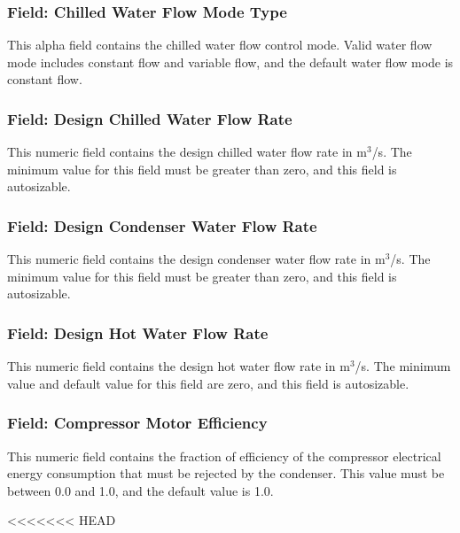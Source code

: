 \subsubsection{Field: Chilled Water Flow Mode Type}\label{field-chilled-water-flow-mode-type}

This alpha field contains the chilled water flow control mode. Valid water flow mode includes constant flow and variable flow, and the default water flow mode is constant flow.

\subsubsection{Field: Design Chilled Water Flow Rate}\label{field-design-chilled-water-flow-rate-8}

This numeric field contains the design chilled water flow rate in m\(^{3}\)/s. The minimum value for this field must be greater than zero, and this field is autosizable.

\subsubsection{Field: Design Condenser Water Flow Rate}\label{field-design-condenser-water-flow-rate-7}

This numeric field contains the design condenser water flow rate in m\(^{3}\)/s. The minimum value for this field must be greater than zero, and this field is autosizable.

\subsubsection{Field: Design Hot Water Flow Rate}\label{field-design-hot-water-flow-rate-2}

This numeric field contains the design hot water flow rate in m\(^{3}\)/s. The minimum value and default value for this field are zero, and this field is autosizable.

\subsubsection{Field: Compressor Motor Efficiency}\label{field-compressor-motor-efficiency}

This numeric field contains the fraction of efficiency of the compressor electrical energy consumption that must be rejected by the condenser. This value must be between 0.0 and 1.0, and the default value is 1.0.

<<<<<<< HEAD

